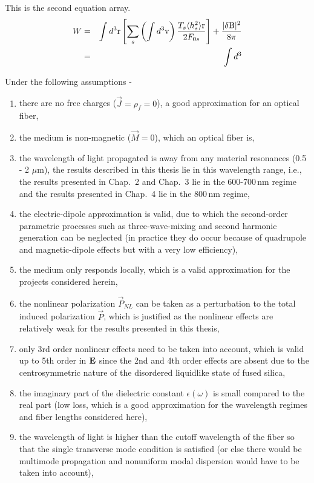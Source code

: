 This is the second equation array.
\begin{eqnarray}
W & = & \int d^3{\rm r} \left[ \sum_s \left( \int d^3{\rm v} \right){T_{s} \langle h^2_s \rangle {\rm r} \over 2F_{0s}} \right] + {|\delta \rm B|^2 \over 8\pi} \nonumber \\
& = & \int d^3
\end{eqnarray}

Under the following assumptions \cite{Agrawal2} -
\begin{enumerate}
\item[(a)]
there are no free charges ($\vec{J}=\rho_{f}=0$), a good approximation for an optical fiber,
\item[(b)] the medium is non-magnetic ($\vec{M}=0$), which an optical fiber is,
\item[(c)] the wavelength of light propagated is away from any material
resonances (0.5 - 2 $\mu$m), the results described in this thesis lie in this wavelength range, i.e., the results presented in Chap.\ 2 and Chap.\ 3 lie in the 600-700\,nm regime and the results presented in Chap.\ 4 lie in the 800\,nm regime,
\item[(d)] the electric-dipole approximation is valid, due to which the second-order parametric processes such as three-wave-mixing and second harmonic generation can be neglected (in practice they do occur because of quadrupole and magnetic-dipole effects but with a very low efficiency),
\item[(e)] the medium only responds locally, which is a valid approximation for the projects considered herein,
\item[(f)] the nonlinear polarization $\vec{P}_{NL}$ can be taken as a
perturbation to the total induced polarization $\vec{P}$, which is justified as the nonlinear effects are relatively weak for the results presented in this thesis,
\item[(g)] only 3rd order nonlinear effects need to be taken into
account, which is valid up to 5th order in ${\bf E}$ since the 2nd and 4th order effects are absent due to the centrosymmetric nature of the disordered liquidlike state of fused silica,
\item[(h)] the imaginary part of the dielectric constant
$\epsilon(\omega)$ is small compared to the real part (low loss, which is a good approximation for the wavelength regimes and fiber lengths considered here),
\item[(i)] the wavelength of light is higher than the cutoff wavelength
of the fiber so that the single transverse mode condition is satisfied (or else there would be multimode propagation and nonuniform modal dispersion would have to be taken into account),

\end{enumerate}
